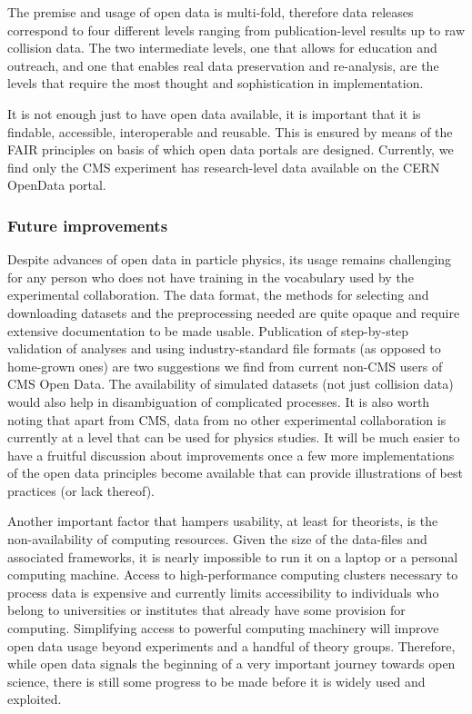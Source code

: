 \documentclass[10pt]{article}
\begin{document}
The premise and usage of open data is multi-fold, therefore data releases correspond to four different levels ranging from publication-level results up to raw collision data.  The two intermediate levels, one that allows for education and outreach, and one that enables real data preservation and re-analysis, are the levels that require the most thought and sophistication in implementation.  

It is not enough just to have open data available, it is important that it is findable, accessible, interoperable and reusable. This is ensured by means of the FAIR principles on basis of which open data portals are designed.  Currently, we find only the CMS experiment has research-level data available on the CERN OpenData portal.  


\subsubsection{Future improvements}
%
Despite advances of open data in particle physics, its usage remains challenging for any person who does not have training in the vocabulary used by the experimental collaboration.  The data format, the methods for selecting and downloading datasets and the preprocessing needed are quite opaque and require extensive documentation to be made usable.  Publication of step-by-step validation of analyses and using industry-standard file formats (as opposed to home-grown ones) are two suggestions we find from current non-CMS users of CMS Open Data. The availability of simulated datasets (not just collision data) would also help in disambiguation of complicated processes.  
It is also worth noting that apart from CMS, data from no other experimental collaboration is currently at a level that can be used for physics studies.  It will be much easier to have a fruitful discussion about improvements once a few more implementations of the open data principles become available that can provide illustrations of best practices (or lack thereof).

Another important factor that hampers usability, at least for theorists, is the non-availability of computing resources.  Given the size of the data-files and associated frameworks, it is nearly impossible to run it on a laptop or a personal computing machine. Access to high-performance computing clusters necessary to process data is expensive and currently limits accessibility to individuals who belong to universities or institutes that already have some provision for computing.  Simplifying access to powerful computing machinery will improve open data usage beyond experiments and a handful of theory groups. 
Therefore, while open data signals the beginning of a very important journey towards open science, there is still some progress to be made before it is widely used and exploited.
\end{document}
